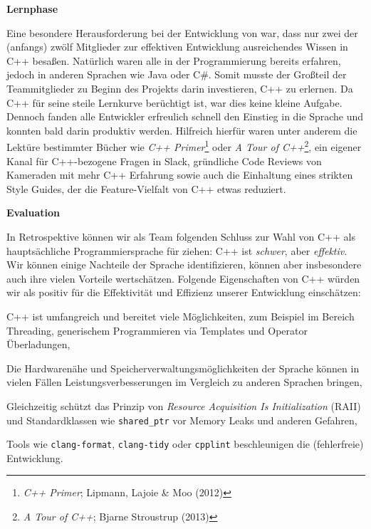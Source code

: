 \textbf{Lernphase}

Eine besondere Herausforderung bei der Entwicklung von \erasim{} war, dass nur
zwei der (anfangs) zwölf Mitglieder zur effektiven Entwicklung ausreichendes
Wissen in C++ besaßen. Natürlich waren alle in der Programmierung bereits
erfahren, jedoch in anderen Sprachen wie Java oder C\#. Somit musste
der Großteil der Teammitglieder zu Beginn des Projekts darin investieren, C++ zu
erlernen. Da C++ für seine steile Lernkurve berüchtigt ist, war dies keine
kleine Aufgabe. Dennoch fanden alle Entwickler erfreulich schnell den Einstieg
in die Sprache und konnten bald darin produktiv werden. Hilfreich hierfür waren
unter anderem die Lektüre bestimmter Bücher wie \emph{C++
Primer}\footnote{\emph{C++ Primer}; Lipmann, Lajoie \& Moo (2012)} oder \emph{A
Tour of C++}\footnote{\emph{A Tour of C++}; Bjarne Stroustrup (2013)}, ein
eigener Kanal für C++-bezogene Fragen in Slack, gründliche Code Reviews
von Kameraden mit mehr C++ Erfahrung sowie auch die Einhaltung eines
strikten Style Guides, der die Feature-Vielfalt von C++ etwas reduziert.

\textbf{Evaluation}

In Retrospektive können wir als Team folgenden Schluss zur Wahl von C++ als hauptsächliche Programmiersprache für \erasim{} ziehen: C++ ist \emph{schwer}, aber \emph{effektiv}. Wir können einige Nachteile der Sprache identifizieren, können aber insbesondere auch ihre vielen Vorteile wertschätzen. Folgende Eigenschaften von C++ würden wir als positiv für die Effektivität und Effizienz unserer Entwicklung einschätzen:
\begin{sitemize}{-0.2cm}
  \item C++ ist umfangreich und bereitet viele Möglichkeiten, zum Beispiel im
  Bereich Threading, generischem Programmieren via Templates und Operator
  Überladungen,
  \item Die Hardwarenähe und Speicherverwaltungsmöglichkeiten der Sprache können
  in vielen Fällen Leistungsverbesserungen im Vergleich zu anderen Sprachen
  bringen,
  \item Gleichzeitig schützt das Prinzip von \emph{Resource Acquisition Is
  Initialization} (RAII) und Standardklassen wie \texttt{shared\_ptr} vor Memory
  Leaks und anderen Gefahren,
  \item Tools wie \texttt{clang-format}, \texttt{clang-tidy} oder
  \texttt{cpplint} beschleunigen die (fehlerfreie) Entwicklung.
\end{sitemize}

